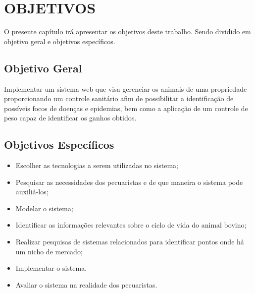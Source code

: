 %
%



\section{OBJETIVOS}\label{chap:objetivos}

O presente capítulo irá apresentar os objetivos deste trabalho. Sendo dividido em objetivo geral e objetivos específicos.

\subsection{\textbf{Objetivo Geral}}

Implementar um sistema web que visa gerenciar os animais de uma propriedade proporcionando um controle sanitário afim de possibilitar a identificação de possíveis focos de doenças e epidemias, bem como a aplicação de um controle de peso capaz de identificar os ganhos obtidos.

\subsection{\textbf{Objetivos Específicos}}

\begin{itemize}
	\item Escolher as tecnologias a serem utilizadas no sistema;
	\item Pesquisar as necessidades dos pecuaristas e de que maneira o sistema pode auxiliá-los;
	\item Modelar o sistema;
	\item Identificar as informações relevantes sobre o ciclo de vida do animal bovino;
	\item Realizar pesquisas de sistemas relacionados para identificar pontos onde há um nicho de mercado;
	\item Implementar o sistema.
	\item Avaliar o sistema na realidade dos pecuaristas.
\end{itemize}
